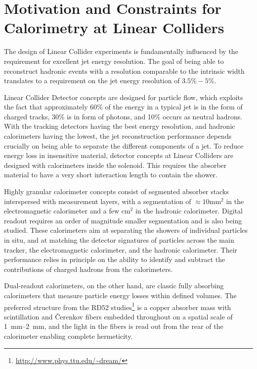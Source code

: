 \section{Motivation and Constraints for Calorimetry at Linear Colliders}

The design of Linear Collider experiments is fundamentally influenced by the requirement for excellent jet energy resolution. The goal of being able to reconstruct hadronic \PZ events with a resolution comparable to the intrinsic width translates to a requirement on the jet energy resolution of $3.5\%-5\%$.

Linear Collider Detector concepts are designed for particle flow, which exploits the fact that approximately 60\% of the energy in a typical jet is in the form of charged tracks, 30\% is in form of photons, and 10\% occurs as neutral hadrons. With the tracking detectors having the best energy resolution, and hadronic calorimeters having the lowest, the jet reconstruction performance depends crucially on being able to separate the different components of a jet. To reduce energy loss in insensitive material, detector concepts at Linear Colliders are designed with calorimeters inside the solenoid. This requires the absorber material to have a very short interaction length to contain the shower.

Highly granular calorimeter concepts consist of segmented absorber stacks interspersed with measurement layers, with a segmentation of $\approx 10\text{mm}^2$ in the electromagnetic calorimeter and a few $\text{cm}^2$ in the hadronic calorimeter. Digital readout requires an order of magnitude smaller segmentation and is also being studied. These calorimeters aim at separating the showers of individual particles in situ, and at matching the detector signatures of particles across the main tracker, the electromagnetic calorimeter, and the hadronic calorimeter. Their performance relies in principle on the ability to identify and subtract the contributions of charged hadrons from the calorimeters.

Dual-readout calorimeters, on the other hand, are classic fully absorbing calorimeters that measure particle energy losses within defined volumes. The preferred structure from the RD52 studies\footnote{\url{http://www.phys.ttu.edu/~dream/}} is a copper absorber mass with scintillation and \v{C}er\-enk\-ov fibers embedded throughout on a spatial scale of \SIrange{1}{2}{mm}, and the light in the fibers is read out from the rear of the calorimeter enabling complete hermeticity. 


